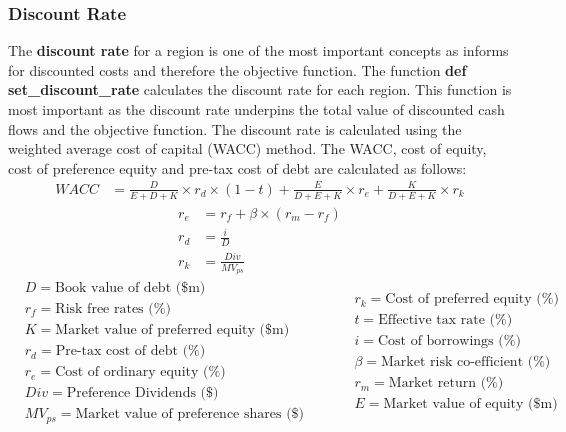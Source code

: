 \documentclass[12pt]{article}
\begin{document}
\subsubsection{Discount Rate}
The \textbf{discount rate} for a region is one of the most important concepts as informs 
for discounted costs and therefore the objective function.
The function \textbf{def set\_discount\_rate} calculates the discount rate for each region.
This function is most important as the discount rate underpins the total value of discounted cash flows and the objective function.
The discount rate is calculated using the weighted average cost of capital (WACC) method.
The WACC, cost of equity, cost of preference equity and pre-tax cost of debt are calculated as follows:
\begin{align}
	WACC &= \frac{D}{E+D+K}\times r_d \times (1-t) + \frac{E}{D+E+K}\times r_e + \frac{K}{D+E+K}\times r_k
\end{align}
\begin{align}
	r_e &= r_f + \beta \times (r_m - r_f)\\
	r_d &= \frac{i}{D}\\
	r_k &= \frac{Div}{MV_{ps}}
\end{align}
\begin{equation*}
	\begin{split}
		&D= \text{Book value of debt (\$m)}\\
		&r_f= \text{Risk free rates (\%)}\\
		&K= \text{Market value of preferred equity (\$m)}\\
		&r_d= \text{Pre-tax cost of debt (\%)}\\
		&r_e= \text{Cost of ordinary equity (\%)}\\
		&Div= \text{Preference Dividends (\$)}\\
		& MV_{ps}= \text{Market value of preference shares (\$)}
	\end{split}
\quad\quad
	\begin{split}
		&r_k= \text{Cost of preferred equity (\%)}\\
		&t= \text{Effective tax rate (\%)}\\
		&i= \text{Cost of borrowings (\%)}\\
		&\beta= \text{Market risk co-efficient (\%)}\\
		&r_m= \text{Market return (\%)}\\
		&E= \text{Market value of equity (\$m)}
	\end{split}
\end{equation*}
\end{document}
